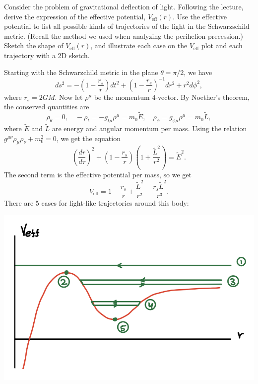 \documentclass{../../templates/lkx_pset}
\begin{document}
\begin{problem}{3}
Consider the problem of gravitational deflection of light. Following the lecture, derive the expression of the effective potential, $V_{\text{eff}}(r)$. Use the effective potential to list all possible kinds of trajectories of the light in the Schwarzschild metric. (Recall the method we used when analyzing the perihelion precession.) Sketch the shape of $V_{\text{eff}}(r)$, and illustrate each case on the $V_{\text{eff}}$ plot and each trajectory with a 2D sketch.
\end{problem}

\begin{solution}
  Starting with the Schwarzchild metric in the plane $\theta = \pi/2$, we have
  \[
    ds^2 = -\left(1-\frac{r_s}{r}\right)dt^2 + (1-\frac{r_s}{r})^{-1}dr^2 + r^2d\phi^2,
  \]
  where $r_s = 2GM$. Now let $\rho^\mu$ be the momentum $4$-vector. By Noether's theorem, the conserved quantities are
  \[
    \rho_\theta = 0, \quad -\rho_t = -g_{t\mu} \rho^\mu = m_0 \widetilde{E}, \quad \rho_\phi = g_{\phi\mu}\rho^\mu = m_0\widetilde{L},
  \]
  where $\widetilde{E}$ and $\widetilde{L}$ are energy and angular momentum per mass. Using the relation $g^{\mu\nu}\rho_\mu \rho_\nu + m_0^2 = 0$, we get the equation
  \[
    \left(\frac{dr}{d\tau}\right)^2 + \left(1-\frac{r_s}{r}\right)\left(1 + \frac{\widetilde{L}^2}{r^2}\right) = \widetilde{E}^2.
  \]
  The second term is the effective potential per mass, so we get
  \[
    V_{\textrm{eff}} = 1 - \frac{r_s}{r} + \frac{\widetilde{L}^2}{r^2} - \frac{r_s \widetilde{L}^2}{r^3}.
  \]
  There are 5 cases for light-like trajectories around this body:
  \begin{center}
    \includegraphics[scale=0.5]{veff.png}

\end{center}
\end{solution}
\end{document}

